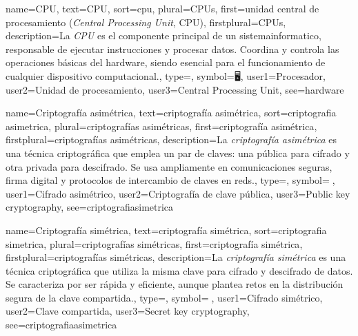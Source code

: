 	{
		name={CPU},
		text={CPU},
		sort={cpu},
		plural={CPUs},
		first={unidad central de procesamiento (\textit{Central Processing Unit}, CPU)},
		firstplural={CPUs},
		description={La \emph{CPU} es el componente principal de un \gls{sistemainformatico}, responsable de ejecutar instrucciones y procesar \glspl{dato}. Coordina y controla las operaciones b{\'a}sicas del \gls{hardware}, siendo esencial para el funcionamiento de cualquier \gls{dispositivo} computacional.},
		type=\glsdefaulttype,
		symbol={🖥️},
		user1={Procesador},
		user2={Unidad de procesamiento},
		user3={Central Processing Unit},
		see={hardware}
	}
	
	
	{
		name={Criptograf{\'i}a asim{\'e}trica},
		text={criptograf{\'i}a asim{\'e}trica},
		sort={criptografia asimetrica},
		plural={criptograf{\'i}as asim{\'e}tricas},
		first={criptograf{\'i}a asim{\'e}trica},
		firstplural={criptograf{\'i}as asim{\'e}tricas},
		description={La \emph{criptograf{\'i}a asim{\'e}trica} es una t{\'e}cnica criptogr{\'a}fica que emplea un par de claves: una p{\'u}blica para \gls{cifrado} y otra privada para descifrado. Se usa ampliamente en comunicaciones seguras, firma digital y protocolos de intercambio de claves en \glspl{red}.},
		type=\glsdefaulttype,
		symbol={🔐},
		user1={Cifrado asim{\'e}trico},
		user2={Criptograf{\'i}a de clave p{\'u}blica},
		user3={Public key cryptography},
		see={criptografiasimetrica}
	}
	
	{
		name={Criptograf{\'i}a sim{\'e}trica},
		text={criptograf{\'i}a sim{\'e}trica},
		sort={criptografia simetrica},
		plural={criptograf{\'i}as sim{\'e}tricas},
		first={criptograf{\'i}a sim{\'e}trica},
		firstplural={criptograf{\'i}as sim{\'e}tricas},
		description={La \emph{criptograf{\'i}a sim{\'e}trica} es una t{\'e}cnica criptogr{\'a}fica que utiliza la misma clave para \gls{cifrado} y descifrado de \glspl{dato}. Se caracteriza por ser r{\'a}pida y eficiente, aunque plantea retos en la distribuci{\'o}n segura de la clave compartida.},
		type=\glsdefaulttype,
		symbol={🔑},
		user1={Cifrado sim{\'e}trico},
		user2={Clave compartida},
		user3={Secret key cryptography},
		see={criptografiaasimetrica}
	}
	
